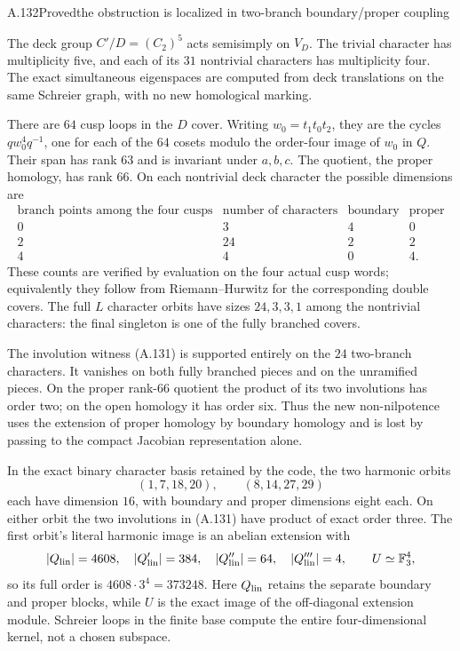 \begin{statement}{A.132}{Proved}{the obstruction is localized in two-branch boundary/proper coupling}
\end{statement}
The deck group $C'/D=(C_2)^5$ acts semisimply on $V_D$.
The trivial character has multiplicity five, and each of its
$31$ nontrivial characters has multiplicity four. The exact
simultaneous eigenspaces are computed from deck translations
on the same Schreier graph, with no new homological marking.

There are $64$ cusp loops in the $D$ cover. Writing
$w_0=t_1t_0t_2$, they are the cycles $q w_0^4q^{-1}$,
one for each of the $64$ cosets modulo the order-four image
of $w_0$ in $Q$. Their span has rank $63$ and is invariant
under $a,b,c$. The quotient, the proper homology, has rank
$66$. On each nontrivial deck character the possible
dimensions are
\[
\begin{array}{c|c|c|c}
 \text{branch points among the four cusps}&
 \text{number of characters}&\text{boundary}&\text{proper}\\\hline
 0&3&4&0\\
 2&24&2&2\\
 4&4&0&4.
\end{array}
 \tag{FP.46.1}
\]
These counts are verified by evaluation on the four actual
cusp words; equivalently they follow from Riemann--Hurwitz
for the corresponding double covers. The full $L$ character
orbits have sizes $24,3,3,1$ among the nontrivial characters:
the final singleton is one of the fully branched covers.

The involution witness (A.131) is supported entirely on the
$24$ two-branch characters. It vanishes on both fully branched
pieces and on the unramified pieces. On the proper rank-$66$
quotient the product of its two involutions has order two;
on the open homology it has order six. Thus the new
non-nilpotence uses the extension of proper homology by
boundary homology and is lost by passing to the compact
Jacobian representation alone.

In the exact binary character basis retained by the code, the
two harmonic orbits
\[
          (1,7,18,20),\qquad (8,14,27,29)
 \tag{FP.46.2}
\]
each have dimension $16$, with boundary and proper dimensions
eight each. On either orbit the two involutions in (A.131)
have product of exact order three. The first orbit's literal
harmonic image is an abelian extension with
\[
 |Q_{\rm lin}|=4608,\quad
 |Q_{\rm lin}'|=384,\quad |Q_{\rm lin}''|=64,
 \quad |Q_{\rm lin}'''|=4,
 \qquad U\simeq\mathbb F_3^4,
\]
so its full order is $4608\cdot3^4=373248$.
Here $Q_{\rm lin}$ retains the separate boundary and proper
blocks, while $U$ is the exact image of the off-diagonal
extension module. Schreier loops in the finite base compute
the entire four-dimensional kernel, not a chosen subspace.

